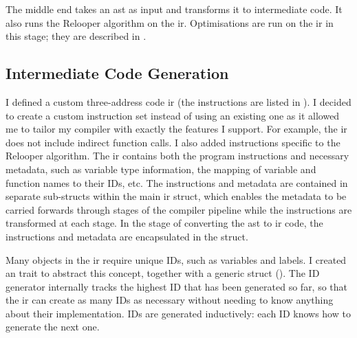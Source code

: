 \documentclass[00-main.tex]{subfiles}
\begin{document}
The middle end takes an \gls{ast} as input and transforms it to intermediate code.
It also runs the Relooper algorithm on the \gls{ir}.
Optimisations are run on the \gls{ir} in this stage; they are described in .

\subsection{Intermediate Code Generation}

I defined a custom three-address code \gls{ir} (the instructions are listed in ).
I decided to create a custom instruction set instead of using an existing one as it allowed me to tailor my compiler with exactly the features I support. For example, the \gls{ir} does not include indirect function calls.
I also added instructions specific to the Relooper algorithm.
The \gls{ir} contains both the program instructions and necessary metadata, such as variable type information, the mapping of variable and function names to their IDs, etc.
The instructions and metadata are contained in separate sub-structs within the main \gls{ir} struct, which enables the metadata to be carried forwards through stages of the compiler pipeline while the instructions are transformed at each stage.
In the stage of converting the \gls{ast} to \gls{ir} code, the instructions and metadata are encapsulated in the  struct.

Many objects in the \gls{ir} require unique IDs, such as variables and labels.
I created an  trait to abstract this concept, together with a generic  struct ().
The ID generator internally tracks the highest ID that has been generated so far, so that the \gls{ir} can create as many IDs as necessary without needing to know anything about their implementation.
IDs are generated inductively: each ID knows how to generate the next one.
\end{document}
